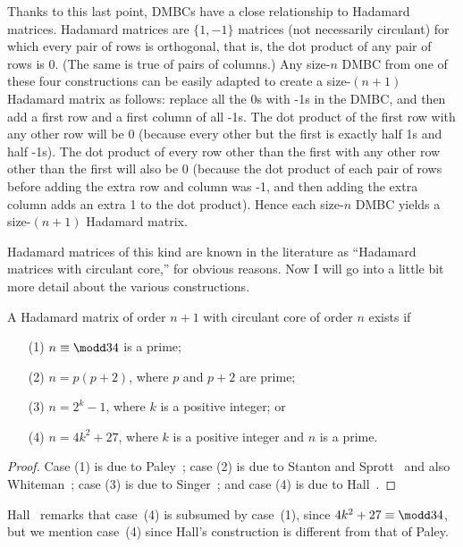 Thanks to this last point, DMBCs have a close relationship to Hadamard matrices. Hadamard matrices are $\{1, -1\}$ matrices (not necessarily circulant) for which every pair of rows is orthogonal, that is, the dot product of any pair of rows is 0. (The same is true of pairs of columns.) Any size-$n$ DMBC from one of these four constructions can be easily adapted to create a size-$(n+1)$ Hadamard matrix as follows: replace all the 0s with -1s in the DMBC, and then add a first row and a first column of all -1s. The dot product of the first row with any other row will be 0 (because every other but the first is exactly half 1s and half -1s). The dot product of every row other than the first with any other row other than the first will also be 0 (because the dot product of each pair of rows before adding the extra row and column was -1, and then adding the extra column adds an extra 1 to the dot product). Hence each size-$n$ DMBC yields a size-$(n+1)$ Hadamard matrix.

Hadamard matrices of this kind are known in the literature as ``Hadamard matrices with circulant core,'' for obvious reasons. Now I will go into a little bit more detail about the various constructions.

\begin{theorem}
\label{thm:circulant_core}
A Hadamard matrix of order $n+1$ with circulant core of order $n$ 
exists if
\begin{itemize}
\item[(1)] $n \equiv \modd 3 4$ is a prime;
\item[(2)] $n = p(p+2)$, where $p$ and $p+2$ are prime;
\item[(3)] $n = 2^k-1$, where $k$ is a positive integer; or
\item[(4)] $n = 4k^2 + 27$, where $k$ is a positive integer
		and $n$ is a prime.
\end{itemize}
\end{theorem}
\begin{proof}
Case (1) is due to Paley~\cite{Paley33}; 
case (2) is due to Stanton and Sprott~\cite{Stanton58} and
also Whiteman~\cite{Whiteman62};
case (3) is due to Singer~\cite{Singer38};
and case (4) is due to Hall~\cite[Theorem 2.2]{Hall56}.
\end{proof}

Hall~\cite[p.~$980$]{Hall56} remarks
that case~(4) %
is subsumed by case~(1), since $4k^2+27 \equiv \modd 3 4$, 
but we mention case~(4) since
Hall's construction is different from that of Paley.

